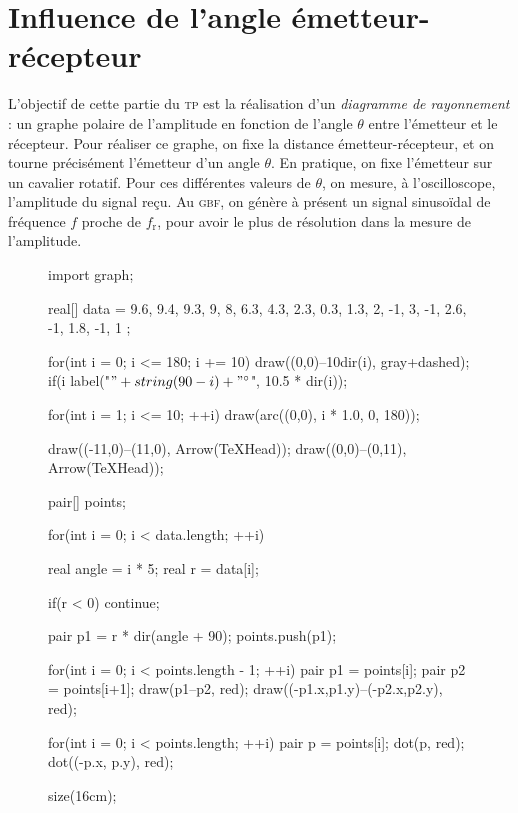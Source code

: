 \documentclass[a4paper,twocolumn,10pt]{report}
\begin{document}
	\section{Influence de l'angle émetteur-récepteur}
	L'objectif de cette partie du \textsc{tp} est la réalisation d'un \textit{diagramme de rayonnement} : un graphe polaire de l'amplitude en fonction de l'angle $\theta$\/ entre l'émetteur et le récepteur.
	Pour réaliser ce graphe, on fixe la distance émetteur-récepteur, et on tourne précisément l'émetteur d'un angle $\theta$.
	En pratique, on fixe l'émetteur sur un cavalier rotatif.
	Pour ces différentes valeurs de $\theta$, on mesure, à l'oscilloscope, l'amplitude du signal reçu. Au \textsc{gbf}, on génère à présent un signal sinusoïdal de fréquence $f$\/ proche de $f_\mathrm{r}$, pour avoir le plus de résolution dans la mesure de l'amplitude.

	\begin{figure}[H]
		\centering
		\begin{asy}
			import graph;

			real[] data = {
				9.6, 9.4, 9.3, 9, 8, 6.3, 4.3, 2.3,
				0.3, 1.3, 2, -1, 3, -1, 2.6, -1, 1.8,
				-1, 1
			};

			for(int i = 0; i <= 180; i += 10) {
				draw((0,0)--10dir(i), gray+dashed);
				if(i %
					label("$" + string(90-i) + "^\circ$", 10.5 * dir(i));
			}

			for(int i = 1; i <= 10; ++i) {
				draw(arc((0,0), i * 1.0, 0, 180));
			}

			draw((-11,0)--(11,0), Arrow(TeXHead));
			draw((0,0)--(0,11), Arrow(TeXHead));

			pair[] points;

			for(int i = 0; i < data.length; ++i) {
				real angle = i * 5;
				real r = data[i];

				if(r < 0) continue;

				pair p1 = r * dir(angle + 90);
				points.push(p1);
			}

			for(int i = 0; i < points.length - 1; ++i) {
				pair p1 = points[i];
				pair p2 = points[i+1];
				draw(p1--p2, red);
				draw((-p1.x,p1.y)--(-p2.x,p2.y), red);
			}

			for(int i = 0; i < points.length; ++i) {
				pair p = points[i];
				dot(p, red);
				dot((-p.x, p.y), red);
			}

			size(16cm);
		\end{asy}
		\caption{}
	\end{figure}
\end{document}
